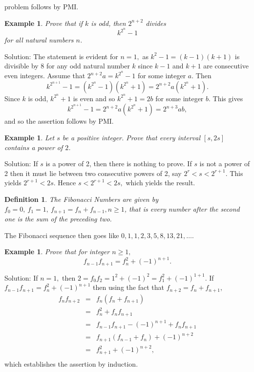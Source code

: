 \documentclass[11pt, openany]{book}
\theoremstyle{change} \theoremheaderfont{\blue\sffamily\bfseries}
\newtheorem{exa}[thm]{Example}
\newtheorem{df}[thm]{Definition}
\theoremstyle{nonumberplain} \theoremheaderfont{\sffamily\bfseries}
\newcommand{\í}{\'{\i}}
\begin{document}
problem follows by PMI.
\begin{exa}
Prove that if $k$ is odd, then $2^{n + 2}$ divides
$$k^{2^n} - 1$$for all natural numbers $n$.

\end{exa}
Solution: The statement is evident for $n = 1,$ as $k^2 - 1 = (k -
1)(k + 1)$ is divisible by 8 for any odd natural number $k$ since
$k - 1$ and $k + 1$ are consecutive even integers. Assume that
$2^{n + 2}a = k^{2^n} - 1$ for some integer $a$. Then
$$k^{2^{n + 1}} - 1 = (k^{2^n} - 1)(k^{2^n} + 1) = 2^{n + 2}a(k^{2^n} + 1).$$Since $k$ is odd,
$k^{2^n} + 1$ is even and so $k^{2^n} + 1 = 2b$ for some integer
$b$. This gives
$$k^{2^{n + 1}} - 1 = 2^{n + 2}a(k^{2^n} + 1)  = 2^{n + 3}ab,$$and so the assertion follows by
PMI.
\begin{exa}
Let $s$ be a positive integer. Prove that every interval $[s, 2s]$
contains a power of $2$.
\end{exa}
Solution: If $s$ is a power of 2, then there is nothing to prove.
If $s$ is not a power of 2 then it must lie between two
consecutive powers of 2, say $2^r < s < 2^{r + 1}.$ This yields
$2^{r + 1} < 2s.$ Hence $s < 2^{r + 1} < 2s,$ which yields the
result.

\begin{df}
The {\em Fibonacci Numbers} are given by $f_0 = 0, \ f_1 = 1, \
f_{n + 1} = f_n + f_{n - 1}, n \geq 1$, that is every number after
the second one is the sum of the preceding two.
\end{df}

The Fibonacci sequence then goes like $0, 1, 1, 2, 3, 5, 8, 13,
21, \ldots .$
\begin{exa}
Prove that for integer $n \geq 1,$
$$f_{n - 1}f_{n + 1} = f_n ^2 + (-1)^{n + 1}.$$
\end{exa}
Solution: If $n = 1,$ then $2 = f_0f_2 = 1^2 + (-1)^2 = f_1 ^2 +
(-1)^{1 + 1}.$ If $f_{n - 1}f_{n + 1} = f_n ^2 + (-1)^{n + 1}$
then using the fact that $f_{n + 2} = f_n + f_{n + 1}$,
$$
\begin{array}{lll}
f_nf_{n + 2} & = & f_n(f_n + f_{n + 1}) \\
& = & f_n ^2 + f_n f_{n + 1} \\
& = & f_{n - 1}f_{n + 1} - (-1)^{n + 1} + f_n f_{n + 1} \\
& = & f_{n + 1}(f_{n - 1} + f_n) + (-1)^{n + 2} \\
& = & f_{n + 1} ^2 + (-1)^{n + 2}, \\

\end{array}
$$
which establishes the assertion by induction.
\end{document}

